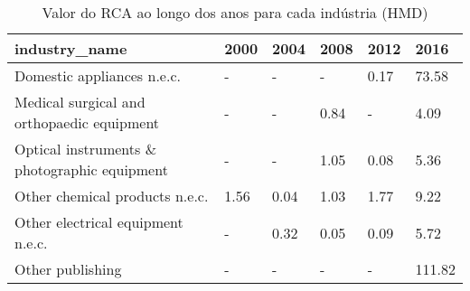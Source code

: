 \begin{table}
\centering
\caption{Valor do RCA ao longo dos anos para cada indústria (HMD)}
\begin{tabular}{p{6cm}p{1.5cm}p{1.5cm}p{1.5cm}p{1.5cm}p{1.5cm}}
\toprule
                               industry\_name & 2000 & 2004 & 2008 & 2012 &   2016 \\
\midrule
                  Domestic appliances n.e.c. &    - &    - &    - & 0.17 &  73.58 \\
  Medical surgical and orthopaedic equipment &    - &    - & 0.84 &    - &   4.09 \\
Optical instruments \& photographic equipment &    - &    - & 1.05 & 0.08 &   5.36 \\
              Other chemical products n.e.c. & 1.56 & 0.04 & 1.03 & 1.77 &   9.22 \\
           Other electrical equipment n.e.c. &    - & 0.32 & 0.05 & 0.09 &   5.72 \\
                            Other publishing &    - &    - &    - &    - & 111.82 \\
\bottomrule
\end{tabular}
\end{table}
